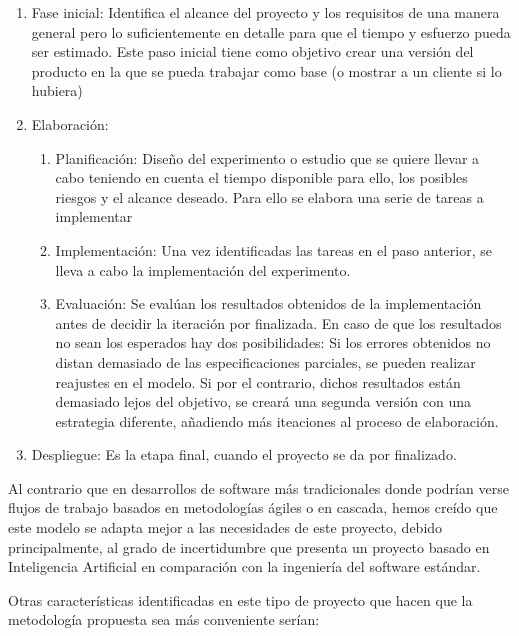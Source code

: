 \documentclass[11pt,a4paper,spanish]{book}
\begin{document}
	\begin{enumerate}
		\item Fase inicial: Identifica el alcance del proyecto y los requisitos de una manera general pero lo suficientemente en detalle para que el tiempo y esfuerzo pueda ser estimado. Este paso inicial tiene como objetivo crear una versión del producto en la que se pueda trabajar como base (o mostrar a un cliente si lo hubiera)
		
		\item Elaboración: 
			\begin{enumerate}
				\item Planificación: Diseño del experimento o estudio que se quiere llevar a cabo teniendo en cuenta el tiempo disponible para ello, los posibles riesgos y el alcance deseado. Para ello se elabora una serie de tareas a implementar
				
				\item Implementación: Una vez identificadas las tareas en el paso anterior, se lleva a cabo la implementación del experimento.
				
				\item Evaluación: Se evalúan los resultados obtenidos de la implementación antes de decidir la iteración por finalizada. En caso de que los resultados no sean los esperados hay dos posibilidades: Si los errores obtenidos no distan demasiado de las especificaciones parciales, se pueden realizar reajustes en el modelo. Si por el contrario, dichos resultados están demasiado lejos del objetivo, se creará una segunda versión con una estrategia diferente, añadiendo más iteaciones al proceso de elaboración.
			\end{enumerate} 
		
		\item Despliegue: Es la etapa final, cuando el proyecto se da por finalizado.
	\end{enumerate}

		Al contrario que en desarrollos de software más tradicionales donde podrían verse flujos de trabajo basados en metodologías ágiles o en cascada, hemos creído que este modelo se adapta mejor a las necesidades de este proyecto, debido principalmente, al grado de incertidumbre que presenta un proyecto basado en Inteligencia Artificial en comparación con la ingeniería del software estándar.
		
		Otras características identificadas en este tipo de proyecto que hacen que la metodología propuesta sea más conveniente serían:
		
\end{document}
